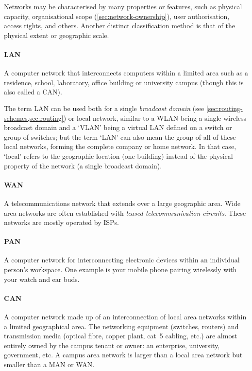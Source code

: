 {Networks may be characterised by many properties or features, such as physical capacity, organisational scope (\vref{sec:network-ownership}), user authorisation, access rights, and others.
Another distinct classification method is that of the physical extent or geographic scale.

\paragraph{\gls{LAN}}%
A computer network that interconnects computers within a limited area such as a residence, school, laboratory, office building or university campus (though this is also called a \acl{CAN}).

The term \gls{LAN} can be used both for a single \emph{broadcast domain} (see \vref{sec:routing-schemes,sec:routing}) or local network, similar to a \acs{WLAN} being a single wireless broadcast domain and a `\acs{VLAN}' being a virtual \gls{LAN} defined on a switch or group of switches; but the term `\gls{LAN}' can also mean the group of all of these local networks, forming the complete company or home network.
In that case, `local' refers to the geographic location (one building) instead of the physical property of the network (a single broadcast domain).

\paragraph{\gls{WAN}}
A telecommunications network that extends over a large geographic area.
Wide area networks are often established with \emph{leased telecommunication circuits}.
These networks are mostly operated by \glspl{ISP}.

\paragraph{\gls{PAN}}
A computer network for interconnecting electronic devices within an individual person's workspace.
One example is your mobile phone pairing wirelessly with your watch and ear buds.

\paragraph{\gls{CAN}}
A computer network made up of an interconnection of local area networks within a limited geographical area.
The networking equipment (switches, routers) and transmission media (optical fibre, copper plant, cat~5 cabling, etc.) are almost entirely owned by the campus tenant or owner: an enterprise, university, government, etc.
A campus area network is larger than a local area network but smaller than a \acs{MAN} or \gls{WAN}.

}
